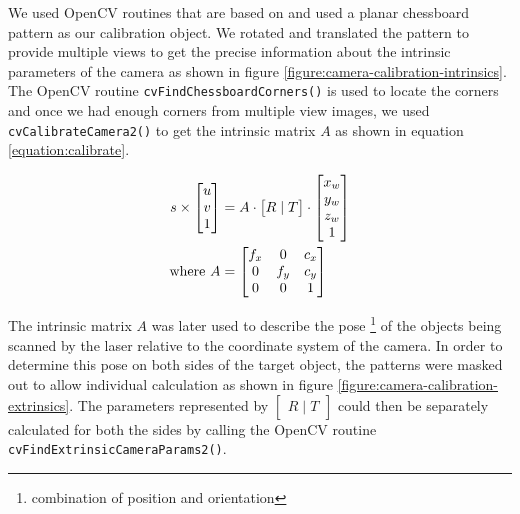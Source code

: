 We used OpenCV routines that are based on \cite{zhang:2000} \cite{brown:1971}
and used a planar chessboard pattern as our calibration object. We rotated and
translated the pattern to provide multiple views to get the precise
information about the intrinsic parameters of the camera as shown in figure
\ref{figure:camera-calibration-intrinsics}.  The OpenCV routine
\texttt{cvFindChessboardCorners()} is used to locate the corners and once we
had enough corners from multiple view images, we used
\texttt{cvCalibrateCamera2()} to get the intrinsic matrix $A$ as shown in
equation \ref{equation:calibrate}.


\begin{align}
	\label{equation:calibrate}
	s \times
	\begin{bmatrix}
		u \\ v \\	1 \\
	\end{bmatrix} &= A \cdot \begin{bmatrix}
															R \mid T
	 				  								\end{bmatrix}
										 \cdot \begin{bmatrix}
															x_w \\ y_w \\ z_w \\ 1
														\end{bmatrix} \\
	\text{where}~
	A &= \begin{bmatrix}
					f_x & 0 & c_x \\
					0 & f_y & c_y \\
					0 & 0 & 1 \\
 		 	 \end{bmatrix} \notag
\end{align}

The intrinsic matrix $A$ was later used to describe the pose
\footnote{combination of position and orientation} of the objects being
scanned by the laser relative to the coordinate system of the camera. In order
to determine this pose on both sides of the target object, the patterns were
masked out to allow individual calculation as shown in figure
\ref{figure:camera-calibration-extrinsics}. The parameters represented by
$\begin{bmatrix}R \mid T\end{bmatrix}$ could then be separately calculated for
both the sides by calling the OpenCV routine
\texttt{cvFindExtrinsicCameraParams2()}.

